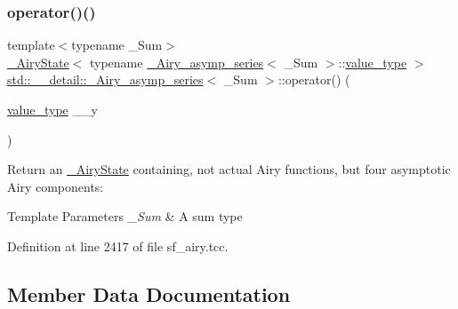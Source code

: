 \subsubsection{\texorpdfstring{operator()()}{operator()()}}
{\footnotesize\ttfamily template$<$typename \+\_\+\+Sum$>$ \\
\hyperlink{structstd_1_1____detail_1_1__AiryState}{\+\_\+\+Airy\+State}$<$ typename \hyperlink{classstd_1_1____detail_1_1__Airy__asymp__series}{\+\_\+\+Airy\+\_\+asymp\+\_\+series}$<$ \+\_\+\+Sum $>$\+::\hyperlink{classstd_1_1____detail_1_1__Airy__asymp__series_a729a698f23629a2f94b6ef71f377efc5}{value\+\_\+type} $>$ \hyperlink{classstd_1_1____detail_1_1__Airy__asymp__series}{std\+::\+\_\+\+\_\+detail\+::\+\_\+\+Airy\+\_\+asymp\+\_\+series}$<$ \+\_\+\+Sum $>$\+::operator() (\begin{DoxyParamCaption}\item[{\hyperlink{classstd_1_1____detail_1_1__Airy__asymp__series_a729a698f23629a2f94b6ef71f377efc5}{value\+\_\+type}}]{\+\_\+\+\_\+y }\end{DoxyParamCaption})}

Return an \hyperlink{structstd_1_1____detail_1_1__AiryState}{\+\_\+\+Airy\+State} containing, not actual Airy functions, but four asymptotic Airy components\+:


\begin{DoxyTemplParams}{Template Parameters}
{\em \+\_\+\+Sum} & A sum type \\
\hline
\end{DoxyTemplParams}


Definition at line 2417 of file sf\+\_\+airy.\+tcc.



\subsection{Member Data Documentation}
\mbox{\label{classstd_1_1____detail_1_1__Airy__asymp__series_a0a4d017f86429e22f5939e689e7b93ca}} 
